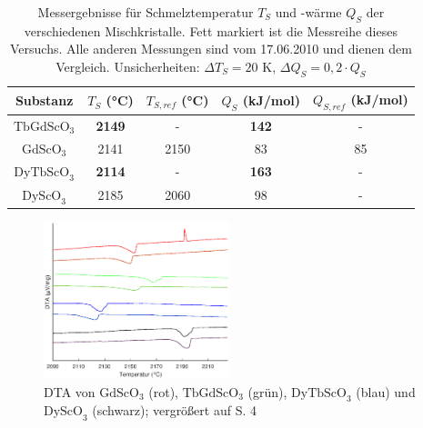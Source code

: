 \documentclass[aps,twocolumn,secnumarabic,nobalancelastpage,amsmath,amssymb,
nofootinbib,superscriptaddress]{revtex4-1}
\begin{document}
\begin{table}[h]
\begin{ruledtabular}
\begin{tabular}{ccccc}
 Substanz & $T_S$ (°C) & $T_{S,ref}$ (°C) & $Q_S$ (kJ/mol) & $Q_{S,ref}$ (kJ/mol)\\
\hline
  \textbf{$\text{TbGdScO}_3$}  & \textbf{2149} & -    & \textbf{142} & -  \\
  $\text{GdScO}_3$    & 2141 & 2150 \cite{paperK} & 83  & 85 \\
  \textbf{$\text{DyTbScO}_3$}  & \textbf{2114} & -    & \textbf{163} & -  \\
  $\text{DyScO}_3$    & 2185 & 2060 \cite{meltpDyScO3} & 98  & - \\
\end{tabular}
\end{ruledtabular}
\caption{\label{tab:erg} Messergebnisse für Schmelztemperatur $T_S$ und -wärme $Q_S$ der verschiedenen Mischkristalle. Fett markiert ist die Messreihe dieses Versuchs.
Alle anderen Messungen sind vom 17.06.2010 und dienen dem Vergleich. Unsicherheiten: $\Delta T_S=20\text{ K}$, $\Delta Q_S=0,2\cdot Q_S$ }
\end{table}

\begin{figure}[h]
  \centering
   \includegraphics[width=0.48\textwidth]{../img/vglSkandate.eps}
  \caption{\label{fig:dtaAll} DTA von $\text{GdScO}_3$ (rot), $\text{TbGdScO}_3$ (grün), $\text{DyTbScO}_3$ (blau) und $\text{DyScO}_3$ (schwarz); vergrößert auf S. 4}
\end{figure}
\end{document}
